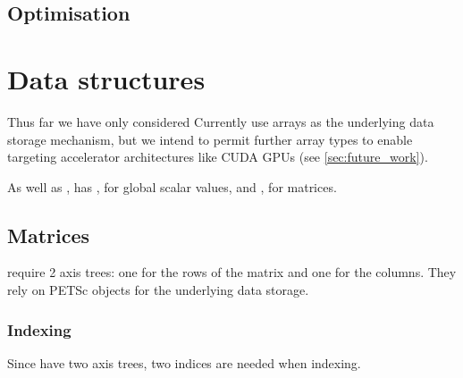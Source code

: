 \documentclass[thesis]{subfiles}
\begin{document}
\subsection{Optimisation}
\label{sec:codegen_optimisation}


\section{Data structures}
\label{sec:data_structures}

Thus far we have only considered
Currently  use \numpy arrays as the underlying data storage mechanism, but we intend to permit further array types to enable targeting accelerator architectures like CUDA GPUs (see \cref{sec:future_work}).

As well as ,  has , for global scalar values, and , for matrices.


\subsection{Matrices}
\label{sec:impl_matrices}


 require 2 axis trees: one for the rows of the matrix and one for the columns.
They rely on PETSc  objects for the underlying data storage.

\subsubsection{Indexing}

Since  have two axis trees, two indices are needed when indexing.

\end{document}
